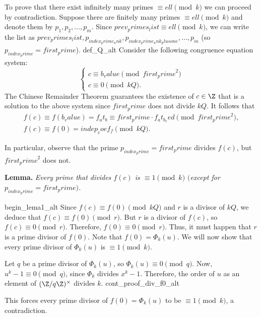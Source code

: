 To prove that there exist infinitely many primes $\equiv {ell} \pmod{{k}}$ we can proceed by contradiction. Suppose there are finitely many primes $\equiv {ell}\pmod{{k}}$ and denote them by $p_1, p_2,\dots,p_m$. Since ${prev_primes_list} \equiv {ell} \pmod{{k}}$, we can write the list as ${prev_primes_list}, p_{{index_prime_unk}},p_{{index_prime_unk_plusone}},\dots, p_m$ (so $p_{{index_prime}}={first_prime}$). {def_Q_alt} Consider the following congruence equation system:
	\begin{equation*}
        \begin{cases}      
		c\equiv {b_value}\pmod{{first_prime}^2}\\
		c\equiv 0\pmod{{k}Q}.
        \end{cases}
	\end{equation*}
The Chinese Remainder Theorem guarantees the existence of $c\in\Z$ that is a solution to the above system since ${first_prime}$ does not divide ${k}Q$. It follows that 
	\begin{gather*}
		f(c)\equiv f({b_value})={f_at_b}\equiv {first_prime}\cdot{f_at_b_red}\pmod{{first_prime}^2},\\
        f(c)\equiv f(0)={indep_coef_f}\pmod{{k}Q}.
	\end{gather*}

In particular, observe that the prime $p_{{index_prime}}={first_prime}$ divides $f(c)$, but ${first_prime}^2$ does not.

\textbf{Lemma.} \emph{Every prime that divides $f(c)$ is $\equiv 1\pmod{{k}}$ $($except for $p_{{index_prime}}={first_prime})$.} 

{begin_lema1_alt} Since $f(c)\equiv f(0)\pmod{{k}Q}$ and $r$ is a divisor of ${k}Q$, we deduce that $f(c)\equiv f(0)\pmod{r}$. But $r$ is a divisor of $f(c)$, so $f(c)\equiv 0 \pmod{r}$. Therefore, $f(0)\equiv 0\pmod{r}$. Thus, it must happen that $r$ is a prime divisor of $f(0)$. Note that $f(0)=\Phi_{{k}}({u})$. We will now show that every prime divisor of $\Phi_{{k}}({u})$ is $\equiv 1 \pmod{{k}}$. 

Let $q$ be a prime divisor of $\Phi_{{k}}({u})$, so $\Phi_{{k}}({u})\equiv 0\pmod{q}$. Now, ${u}^{{k}}-1\equiv 0\pmod{q}$, since $\Phi_{{k}}$ divides $x^{{k}}-1$. Therefore, the order of ${u}$ as an element of $(\Z/q\Z)^\times$ divides ${k}$. {cont_proof_div_f0_alt}

This forces every prime divisor of $f(0)=\Phi_{{k}}({u})$ to be $\equiv 1 \pmod{{k}}$, a contradiction.